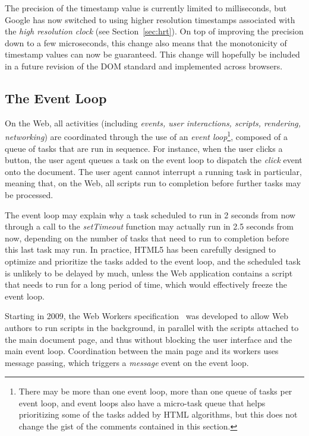 The precision of the timestamp value is currently limited to milliseconds, but
Google has now switched to using higher resolution timestamps associated with
the \emph{high resolution clock} (see Section~\ref{sec:hrt}). On top of
improving the precision down to a few microseconds, this change also means
that the monotonicity of timestamp values can now be guaranteed. This change
will hopefully be included in a future revision of the DOM standard and
implemented across browsers.



\subsection{The Event Loop}
\label{sec:eventloop}

On the Web, all activities (including \emph{events, user interactions,
scripts, rendering, networking}) are coordinated through the use of an
\emph{event loop}\footnote{There may be more than one event loop, more than
one queue of tasks per event loop, and event loops also have a micro-task
queue that helps prioritizing some of the tasks added by HTML algorithms, but
this does not change the gist of the comments contained in this section.},
composed of a queue of tasks that are run in sequence. For instance, when the
user clicks a button, the user agent queues a task on the event loop to
dispatch the \emph{click} event onto the document. The user agent cannot
interrupt a running task in particular, meaning that, on the Web, all scripts
run to completion before further tasks may be processed.

The event loop may explain why a task scheduled to run in 2 seconds from now
through a call to the \emph{setTimeout} function may actually run in 2.5 seconds
from now, depending on the number of tasks that need to run to completion
before this last task may run. In practice, HTML5 has been carefully designed
to optimize and prioritize the tasks added to the event loop, and the
scheduled task is unlikely to be delayed by much, unless the Web application
contains a script that needs to run for a long period of time, which would
effectively freeze the event loop.

Starting in 2009, the Web Workers specification~\cite{webworkers} was developed to allow
Web authors to run scripts in the background, in parallel with the scripts
attached to the main document page, and thus without blocking the user
interface and the main event loop. Coordination between the main page and its
workers uses message passing, which triggers a \emph{message} event on the event
loop.


